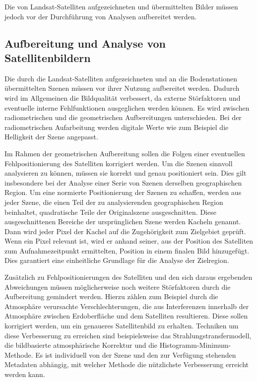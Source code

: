 Die von Landsat-Satelliten aufgezeichneten und übermittelten Bilder müssen jedoch vor der Durchführung von Analysen aufbereitet werden.


\subsection{Aufbereitung und Analyse von Satellitenbildern}
Die durch die Landsat-Satelliten aufgezeichneten und an die Bodenstationen übermittelten Szenen müssen vor ihrer Nutzung aufbereitet werden. Dadurch wird im Allgemeinen die Bildqualität verbessert, da externe Störfaktoren und eventuelle interne Fehlfunktionen ausgeglichen werden können. Es wird zwischen radiometrischen und die geometrischen Aufbereitungen unterschieden. Bei der radiometrischen Aufarbeitung werden digitale Werte wie zum Beispiel die Helligkeit der Szene angepasst. 

Im Rahmen der geometrischen Aufbereitung sollen die Folgen einer eventuellen Fehlpositionierung des Satelliten korrigiert werden. Um die Szenen sinnvoll analysieren zu können, müssen sie korrekt und genau positioniert sein. Dies gilt insbesondere bei der Analyse einer Serie von Szenen derselben geographischen Region. Um eine normierte Positionierung der Szenen zu schaffen, werden aus jeder Szene, die einen Teil der zu analysierenden geographischen Region beinhaltet, quadratische Teile der Originalszene ausgeschnitten. Diese ausgeschnittenen Bereiche der ursprünglichen Szene werden Kacheln genannt. Dann wird jeder Pixel der Kachel auf die Zugehörigkeit zum Zielgebiet geprüft. Wenn ein Pixel relevant ist, wird er anhand seiner, aus der Position des Satelliten zum Aufnahmezeitpunkt ermittelten, Position in einem finalen Bild hinzugefügt. Dies garantiert eine einheitliche Grundlage für die Analyse der Zielregion.

Zusätzlich zu Fehlpositionierungen des Satelliten und den sich daraus ergebenden Abweichungen müssen möglicherweise noch weitere Störfaktoren durch die Aufbereitung gemindert werden. Hierzu zählen zum Beispiel durch die Atmosphäre verursachte Verschlechterungen, die aus Interferenzen innerhalb der Atmosphäre zwischen Erdoberfläche und dem Satelliten resultieren. Diese sollen korrigiert werden, um ein genaueres Satellitenbild zu erhalten. Techniken um diese Verbesserung zu erreichen sind beispielsweise das Strahlungstransfermodell, die bildbasierte atmosphärische Korrektur und die Histogramm-Minimum-Methode. Es ist individuell von der Szene und den zur Verfügung stehenden Metadaten abhängig, mit welcher Methode die nützlichste Verbesserung erreicht werden kann.

